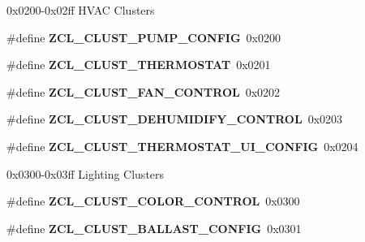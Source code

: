 0x0200-\/0x02ff H\-V\-A\-C Clusters \begin{DoxyCompactItemize}
\item 
\hypertarget{group__zcl_ga498ed423dfc4bdfec0fd83ce47f2f0f3}{\#define {\bfseries Z\-C\-L\-\_\-\-C\-L\-U\-S\-T\-\_\-\-P\-U\-M\-P\-\_\-\-C\-O\-N\-F\-I\-G}~0x0200}\label{group__zcl_ga498ed423dfc4bdfec0fd83ce47f2f0f3}

\item 
\hypertarget{group__zcl_gaad276e851819eb0847930b299b886029}{\#define {\bfseries Z\-C\-L\-\_\-\-C\-L\-U\-S\-T\-\_\-\-T\-H\-E\-R\-M\-O\-S\-T\-A\-T}~0x0201}\label{group__zcl_gaad276e851819eb0847930b299b886029}

\item 
\hypertarget{group__zcl_ga472e1fc64714dc49510922fc3012c6df}{\#define {\bfseries Z\-C\-L\-\_\-\-C\-L\-U\-S\-T\-\_\-\-F\-A\-N\-\_\-\-C\-O\-N\-T\-R\-O\-L}~0x0202}\label{group__zcl_ga472e1fc64714dc49510922fc3012c6df}

\item 
\hypertarget{group__zcl_gaa5b947e5e872b25c8779ad332cd827d2}{\#define {\bfseries Z\-C\-L\-\_\-\-C\-L\-U\-S\-T\-\_\-\-D\-E\-H\-U\-M\-I\-D\-I\-F\-Y\-\_\-\-C\-O\-N\-T\-R\-O\-L}~0x0203}\label{group__zcl_gaa5b947e5e872b25c8779ad332cd827d2}

\item 
\hypertarget{group__zcl_ga62cebc179e8588411483c047dbd56476}{\#define {\bfseries Z\-C\-L\-\_\-\-C\-L\-U\-S\-T\-\_\-\-T\-H\-E\-R\-M\-O\-S\-T\-A\-T\-\_\-\-U\-I\-\_\-\-C\-O\-N\-F\-I\-G}~0x0204}\label{group__zcl_ga62cebc179e8588411483c047dbd56476}

\end{DoxyCompactItemize}
\label{_amgrp01747264fe7bf50731df0522c351974e}%
0x0300-\/0x03ff Lighting Clusters \begin{DoxyCompactItemize}
\item 
\hypertarget{group__zcl_ga9d7f67c80b4ee0fc4c1d216d72eb1d21}{\#define {\bfseries Z\-C\-L\-\_\-\-C\-L\-U\-S\-T\-\_\-\-C\-O\-L\-O\-R\-\_\-\-C\-O\-N\-T\-R\-O\-L}~0x0300}\label{group__zcl_ga9d7f67c80b4ee0fc4c1d216d72eb1d21}

\item 
\hypertarget{group__zcl_ga5422419fb816668fc07ccdd5d630fea1}{\#define {\bfseries Z\-C\-L\-\_\-\-C\-L\-U\-S\-T\-\_\-\-B\-A\-L\-L\-A\-S\-T\-\_\-\-C\-O\-N\-F\-I\-G}~0x0301}\label{group__zcl_ga5422419fb816668fc07ccdd5d630fea1}

\end{DoxyCompactItemize}
\label{_amgrp01747264fe7bf50731df0522c351974e}%
